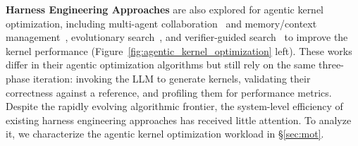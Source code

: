 \noindent\textbf{Harness Engineering Approaches} are also explored for agentic kernel optimization, including multi-agent collaboration~\cite{cudaforge,KernelSkill,Astra} and memory/context management~\cite{STARK,CuTeGen,K-Search}, evolutionary search~\cite{AlphaEvolve,openevolve,kernelagent2025,Kernel-Smith,KernelEvolve}, and verifier-guided search~\cite{ImprovingEfficiencyOfGPUKernelOptimizationAgents,AutoKernel,SwizzlePerf} to improve the kernel performance (Figure~\ref{fig:agentic_kernel_optimization} left). These works differ in their agentic optimization algorithms but still rely on the same three-phase iteration: invoking the LLM to generate kernels, validating their correctness against a reference, and profiling them for performance metrics.
Despite the rapidly evolving algorithmic frontier, the system-level efficiency of existing harness engineering approaches has received little attention. To analyze it, we characterize the agentic kernel optimization workload in \S\ref{sec:mot}.
